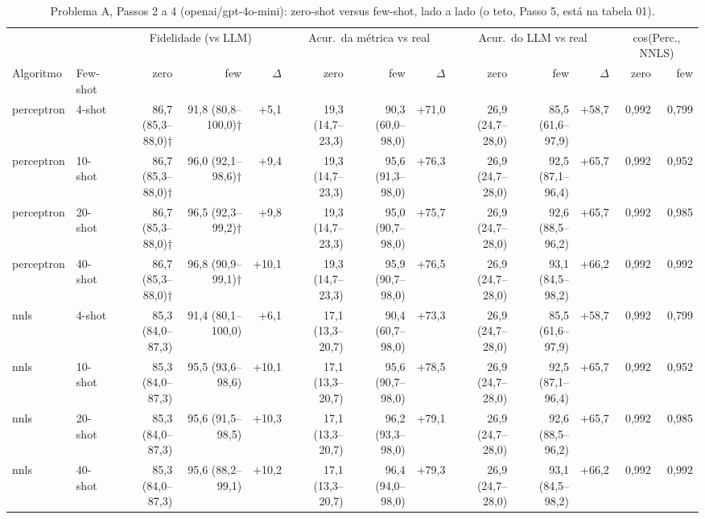 \begin{table}[htbp]
\centering
\footnotesize
\caption{Problema A, Passos 2 a 4 (openai/gpt-4o-mini): zero-shot versus few-shot, lado a lado (o teto, Passo 5, está na tabela 01).}
\label{tab:A_passo2_vs_passo3_gpt4mini}
\begin{tabular}{llrrrrrrrrrrr}
\toprule
 &  & \multicolumn{3}{c}{Fidelidade (vs LLM)} & \multicolumn{3}{c}{Acur.\ da métrica vs real} & \multicolumn{3}{c}{Acur.\ do LLM vs real} & \multicolumn{2}{c}{cos(Perc., NNLS)} \\ \cmidrule(lr){3-5} \cmidrule(lr){6-8} \cmidrule(lr){9-11} \cmidrule(lr){12-13}
Algoritmo & Few-shot & zero & few & $\Delta$ & zero & few & $\Delta$ & zero & few & $\Delta$ & zero & few \\
\midrule
perceptron & 4-shot & 86,7 (85,3–88,0)† & 91,8 (80,8–100,0)† & +5,1 & 19,3 (14,7–23,3) & 90,3 (60,0–98,0) & +71,0 & 26,9 (24,7–28,0) & 85,5 (61,6–97,9) & +58,7 & 0,992 & 0,799 \\
perceptron & 10-shot & 86,7 (85,3–88,0)† & 96,0 (92,1–98,6)† & +9,4 & 19,3 (14,7–23,3) & 95,6 (91,3–98,0) & +76,3 & 26,9 (24,7–28,0) & 92,5 (87,1–96,4) & +65,7 & 0,992 & 0,952 \\
perceptron & 20-shot & 86,7 (85,3–88,0)† & 96,5 (92,3–99,2)† & +9,8 & 19,3 (14,7–23,3) & 95,0 (90,7–98,0) & +75,7 & 26,9 (24,7–28,0) & 92,6 (88,5–96,2) & +65,7 & 0,992 & 0,985 \\
perceptron & 40-shot & 86,7 (85,3–88,0)† & 96,8 (90,9–99,1)† & +10,1 & 19,3 (14,7–23,3) & 95,9 (90,7–98,0) & +76,5 & 26,9 (24,7–28,0) & 93,1 (84,5–98,2) & +66,2 & 0,992 & 0,992 \\
\midrule
nnls & 4-shot & 85,3 (84,0–87,3) & 91,4 (80,1–100,0) & +6,1 & 17,1 (13,3–20,7) & 90,4 (60,7–98,0) & +73,3 & 26,9 (24,7–28,0) & 85,5 (61,6–97,9) & +58,7 & 0,992 & 0,799 \\
nnls & 10-shot & 85,3 (84,0–87,3) & 95,5 (93,6–98,6) & +10,1 & 17,1 (13,3–20,7) & 95,6 (90,7–98,0) & +78,5 & 26,9 (24,7–28,0) & 92,5 (87,1–96,4) & +65,7 & 0,992 & 0,952 \\
nnls & 20-shot & 85,3 (84,0–87,3) & 95,6 (91,5–98,5) & +10,3 & 17,1 (13,3–20,7) & 96,2 (93,3–98,0) & +79,1 & 26,9 (24,7–28,0) & 92,6 (88,5–96,2) & +65,7 & 0,992 & 0,985 \\
nnls & 40-shot & 85,3 (84,0–87,3) & 95,6 (88,2–99,1) & +10,2 & 17,1 (13,3–20,7) & 96,4 (94,0–98,0) & +79,3 & 26,9 (24,7–28,0) & 93,1 (84,5–98,2) & +66,2 & 0,992 & 0,992 \\
\bottomrule

\end{tabular}
\end{table}
